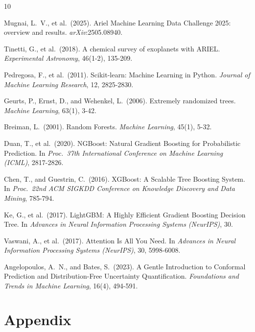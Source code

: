 \documentclass[12pt]{article}
\begin{document}
\begin{thebibliography}{10}

Mugnai, L.~V., et al.\ (2025).
\newblock Ariel Machine Learning Data Challenge 2025: overview and results.
\newblock \textit{arXiv}:2505.08940.

Tinetti, G., et al.\ (2018).
\newblock A chemical survey of exoplanets with ARIEL.
\newblock \textit{Experimental Astronomy}, 46(1-2), 135-209.

Pedregosa, F., et al.\ (2011).
\newblock Scikit-learn: Machine Learning in Python.
\newblock \textit{Journal of Machine Learning Research}, 12, 2825-2830.

Geurts, P., Ernst, D., and Wehenkel, L.\ (2006).
\newblock Extremely randomized trees.
\newblock \textit{Machine Learning}, 63(1), 3-42.

Breiman, L.\ (2001).
\newblock Random Forests.
\newblock \textit{Machine Learning}, 45(1), 5-32.

Duan, T., et al.\ (2020).
\newblock NGBoost: Natural Gradient Boosting for Probabilistic Prediction.
\newblock In \textit{Proc.\ 37th International Conference on Machine Learning (ICML)}, 2817-2826.

Chen, T., and Guestrin, C.\ (2016).
\newblock XGBoost: A Scalable Tree Boosting System.
\newblock In \textit{Proc.\ 22nd ACM SIGKDD Conference on Knowledge Discovery and Data Mining}, 785-794.

Ke, G., et al.\ (2017).
\newblock LightGBM: A Highly Efficient Gradient Boosting Decision Tree.
\newblock In \textit{Advances in Neural Information Processing Systems (NeurIPS)}, 30.

Vaswani, A., et al.\ (2017).
\newblock Attention Is All You Need.
\newblock In \textit{Advances in Neural Information Processing Systems (NeurIPS)}, 30, 5998-6008.

Angelopoulos, A.~N., and Bates, S.\ (2023).
\newblock A Gentle Introduction to Conformal Prediction and Distribution-Free Uncertainty Quantification.
\newblock \textit{Foundations and Trends in Machine Learning}, 16(4), 494-591.

\end{thebibliography}


\section{Appendix}
\end{document}
